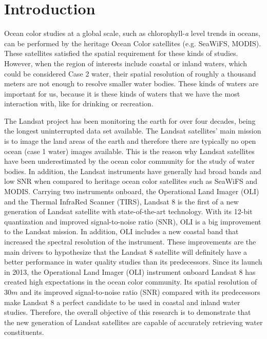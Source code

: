 \chapter{Introduction}
\label{ch:introduction} 
Ocean color studies at a global scale, such as chlorophyll-{\it a} level trends in oceans, can be performed by the heritage Ocean Color satellites (e.g. SeaWiFS, MODIS). These satellites satisfied the spatial requirement for these kinds of studies. However, when the region of interests include coastal or inland waters, which could be considered Case 2 water, their spatial resolution of roughly a thousand meters are not enough to resolve smaller water bodies. These kinds of waters are important for us, because it is these kinds of waters that we have the most interaction with, like for drinking or recreation. 

The Landsat project has been monitoring the earth for over four decades, being the longest uninterrupted data set available. The Landsat satellites' main mission is to image the land areas of the earth and therefore there are typically no open ocean (case 1 water) images available. This is the reason why Landsat satellites have been underestimated by the ocean color community for the study of water bodies. In addition, the Landsat instruments have generally had broad bands and low SNR when compared to heritage ocean color satellites such as SeaWiFS and MODIS. Carrying two instruments onboard, the Operational Land Imager (OLI) and the Thermal InfraRed Scanner (TIRS), Landsat 8 is the first of a new generation of Landsat satellite with state-of-the-art technology. With its 12-bit quantization and improved signal-to-noise ratio (SNR), OLI is a big improvement to the Landsat mission. In addition, OLI includes a new coastal band that increased the spectral resolution of the instrument. These improvements are the main drivers to hypothesize that the Landsat 8 satellite will definitely have a better performance in water quality studies than its predecessors. Since its launch in 2013, the Operational Land Imager (OLI) instrument onboard Landsat 8 has created high expectations in the ocean color community. Its spatial resolution of $30m$ and its improved signal-to-noise ratio (SNR) compared with its predecessors make Landsat 8 a perfect candidate to be used in coastal and inland water studies. Therefore, the overall objective of this research is to demonstrate that the new generation of Landsat satellites are capable of accurately retrieving water constituents.

